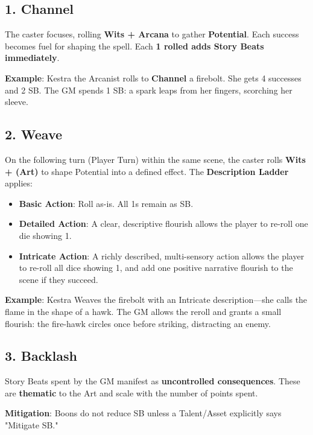 \subsection*{1. Channel}

The caster focuses, rolling \textbf{Wits + Arcana} to gather \textbf{Potential}. Each success becomes fuel for shaping the spell. Each \textbf{1 rolled adds Story Beats immediately}.

\textbf{Example}: Kestra the Arcanist rolls to \textbf{Channel} a firebolt. She gets 4 successes and 2 SB. The GM spends 1 SB: a spark leaps from her fingers, scorching her sleeve.

\subsection*{2. Weave}

On the following turn (Player Turn) within the same scene, the caster rolls \textbf{Wits + (Art)} to shape Potential into a defined effect. The \textbf{Description Ladder} applies:

\begin{itemize}
    \item \textbf{Basic Action}: Roll as-is. All 1s remain as SB.
    \item \textbf{Detailed Action}: A clear, descriptive flourish allows the player to re-roll one die showing 1.
    \item \textbf{Intricate Action}: A richly described, multi-sensory action allows the player to re-roll all dice showing 1, and add one positive narrative flourish to the scene if they succeed.
\end{itemize}

\textbf{Example}: Kestra Weaves the firebolt with an Intricate description---she calls the flame in the shape of a hawk. The GM allows the reroll and grants a small flourish: the fire-hawk circles once before striking, distracting an enemy.

\subsection*{3. Backlash}

Story Beats spent by the GM manifest as \textbf{uncontrolled consequences}. These are \textbf{thematic} to the Art and scale with the number of points spent.

\textbf{Mitigation}: Boons do not reduce SB unless a Talent/Asset explicitly says "Mitigate SB."

